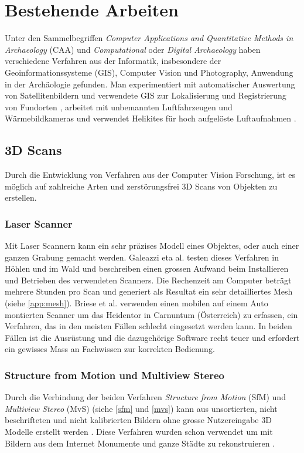 \chapter{Bestehende Arbeiten}

	Unter den Sammelbegriffen \emph{Computer Applications and Quantitative Methods in Archaeology} (CAA) und \emph{Computational} oder \emph{Digital Archaeology} haben verschiedene Verfahren aus der Informatik, insbesondere der Geoinformationssysteme (GIS), Computer Vision und Photography, Anwendung in der Archäologie gefunden.
	Man experimentiert mit automatischer Auswertung von Satellitenbildern und verwendete GIS zur Lokalisierung und Registrierung von Fundorten \cite{comp_app_arch}, arbeitet mit unbemannten Luftfahrzeugen und Wärmebildkameras \cite{Casana2014207} und verwendet Helikites für hoch aufgelöste Luftaufnahmen \cite{ARCM:ARCM667}.

	\section{3D Scans}
		Durch die Entwicklung von Verfahren aus der Computer Vision Forschung, ist es möglich auf zahlreiche Arten und zerstörungsfrei 3D Scans von Objekten zu erstellen.
		\subsection{Laser Scanner}
			Mit Laser Scannern kann ein sehr präzises Modell eines Objektes, oder auch einer ganzen Grabung gemacht werden. Galeazzi eta al. \cite{arch:laser_vs_dense_stereo} testen dieses Verfahren in Höhlen und im Wald und beschreiben einen grossen Aufwand beim Installieren und Betrieben des verwendeten Scanners. Die Rechenzeit am Computer beträgt mehrere Stunden pro Scan und generiert als Resultat ein sehr detailliertes Mesh (siehe \autoref{app:mesh}).
			Briese et al. \cite{TUW-210216} verwenden einen mobilen auf einem Auto montierten Scanner um das Heidentor in Carnuntum (Österreich) zu erfassen, ein Verfahren, das in den meisten Fällen schlecht eingesetzt werden kann.
			In beiden Fällen ist die Ausrüstung und die dazugehörige Software recht teuer und erfordert ein gewisses Mass an Fachwissen zur korrekten Bedienung.

		\subsection{Structure from Motion und Multiview Stereo}
			Durch die Verbindung der beiden Verfahren \emph{Structure from Motion} (SfM) und \emph{Multiview Stereo} (MvS) (siehe \autoref{sfm} und \autoref{mvs}) kann aus unsortierten, nicht beschrifteten und nicht kalibrierten Bildern ohne grosse Nutzereingabe 3D Modelle erstellt werden \cite{Szeliski:2010:CVA:1941882, Agarwal:2011:BRD:2001269.2001293, Furu:2010:PMVS}. Diese Verfahren wurden schon verwendet um mit Bildern aus dem Internet Monumente und ganze Städte zu rekonstruieren \cite{Agarwal:2011:BRD:2001269.2001293, Furu:2010, Frahm_buildingrome, Snavely:2006:PTE:1179352.1141964}.
			
